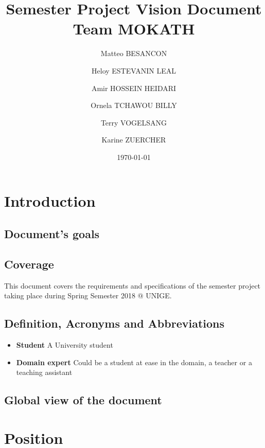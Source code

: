 \documentclass[12pt,a4paper,oneside, titlepage]{article}
\title {Semester Project Vision Document  \\ \large Team MOKATH}
\author{Matteo BESANCON}
\author{Heloy ESTEVANIN LEAL}
\author{Amir HOSSEIN HEIDARI}
\author{Ornela TCHAWOU BILLY}
\author{Terry VOGELSANG}
\author{Karine ZUERCHER}
\affil{Centre Universitaire D'Informatique, University Of Geneva}
\date{\today}
\begin{document}
	\renewcommand{\labelitemi}{$\bullet$}
	\maketitle
	\tableofcontents
	\newpage
	

	\section{Introduction}
	
		\subsection{Document's goals}
		\subsection{Coverage}
		    This document covers the requirements and specifications of the semester project
		    taking place during Spring Semester 2018 @ UNIGE.
		    
		\subsection{Definition, Acronyms and Abbreviations}
		
		\begin{itemize}
		
		    \item \textbf{Student} A University student
		    \item \textbf{Domain expert} Could be a student at ease in the domain, a teacher or a teaching 
		    assistant
		    
		\end{itemize}
	
		\subsection{Global view of the document}
		
    \newpage
	\section{Position}		
		
\end{document}
